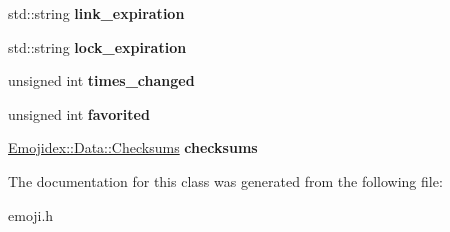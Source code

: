 \begin{DoxyCompactItemize}
\item 
std\+::string {\bfseries link\+\_\+expiration}\hypertarget{classEmojidex_1_1Data_1_1Emoji_abd597aeadcd7200b1699b61b70b0b183}{}\label{classEmojidex_1_1Data_1_1Emoji_abd597aeadcd7200b1699b61b70b0b183}

\item 
std\+::string {\bfseries lock\+\_\+expiration}\hypertarget{classEmojidex_1_1Data_1_1Emoji_ab89f5f4534ea2f04093a314304514786}{}\label{classEmojidex_1_1Data_1_1Emoji_ab89f5f4534ea2f04093a314304514786}

\item 
unsigned int {\bfseries times\+\_\+changed}\hypertarget{classEmojidex_1_1Data_1_1Emoji_a259f6b01221b548c048612b1c73cdf95}{}\label{classEmojidex_1_1Data_1_1Emoji_a259f6b01221b548c048612b1c73cdf95}

\item 
unsigned int {\bfseries favorited}\hypertarget{classEmojidex_1_1Data_1_1Emoji_ace2b4c0ce6c36f8b8562f2494aa4c306}{}\label{classEmojidex_1_1Data_1_1Emoji_ace2b4c0ce6c36f8b8562f2494aa4c306}

\item 
\hyperlink{classEmojidex_1_1Data_1_1Checksums}{Emojidex\+::\+Data\+::\+Checksums} {\bfseries checksums}\hypertarget{classEmojidex_1_1Data_1_1Emoji_aa0c2638f3d68e538a247e22ad70f6255}{}\label{classEmojidex_1_1Data_1_1Emoji_aa0c2638f3d68e538a247e22ad70f6255}

\end{DoxyCompactItemize}


The documentation for this class was generated from the following file\+:\begin{DoxyCompactItemize}
\item 
emoji.\+h\end{DoxyCompactItemize}
